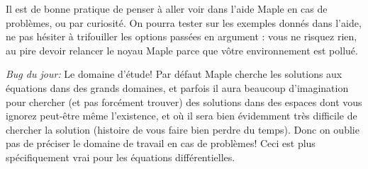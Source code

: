 \documentclass[10pt,a4paper]{article}
\begin{document}
 Il est de bonne pratique de penser à aller voir dans l'aide Maple en cas de problèmes, ou par curiosité. On pourra tester sur les exemples donnés dans l'aide, ne pas hésiter à trifouiller les options passées en argument : vous ne risquez rien, au pire devoir relancer le noyau Maple parce que vôtre environnement est pollué.

% 
%
\begin{framed}
\emph{Bug du jour:} Le domaine d'étude! Par défaut Maple cherche les solutions aux équations dans des grands domaines, et parfois il aura beaucoup d'imagination pour chercher (et pas forcément trouver) des solutions dans des espaces dont vous ignorez peut-être même l'existence, et où il sera bien évidemment très difficile de chercher la solution (histoire de vous faire bien perdre du temps). Donc on oublie pas de préciser le domaine de travail en cas de problèmes! Ceci est plus spécifiquement vrai pour les équations différentielles.
\end{framed}
%
%
%
%
\end{document}

